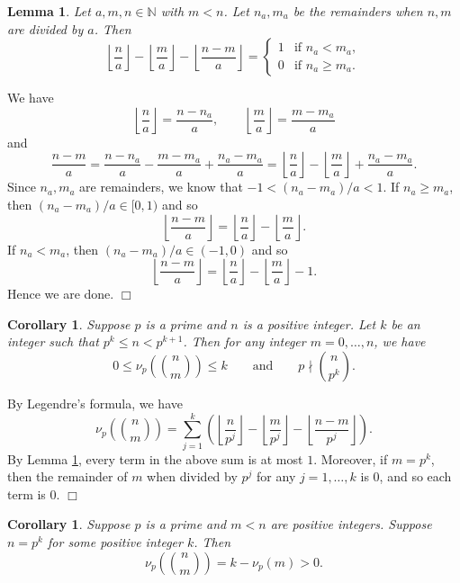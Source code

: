 \documentclass{article}
\def\N{{\mathbb N}}
\newtheorem{cor}[subsection]{Corollary}
\newtheorem{lemma}[subsection]{Lemma}
\newenvironment{proof}{\noindent {\bf Proof:}}{$\Box$ \vspace{2 ex}}
\begin{document}
\begin{lemma}\label{lem:ind}
    Let $a,m,n\in\N$ with $m < n$. Let $n_a,m_a$ be the remainders when $n,m$ are divided by $a$. Then
    $$\left\lfloor\frac{n}{a}\right\rfloor - \left\lfloor\frac{m}{a}\right\rfloor - \left\lfloor\frac{n-m}{a}\right\rfloor = \begin{cases}
        1&\mbox{if }n_a < m_a,\\
        0&\mbox{if }n_a\geq m_a.
    \end{cases}$$
\end{lemma}

\begin{proof}
    We have
    $$\left\lfloor\frac{n}{a}\right\rfloor = \frac{n-n_a}{a},\qquad\left\lfloor\frac{m}{a}\right\rfloor = \frac{m-m_a}{a}$$ and $$\frac{n-m}{a} = \frac{n-n_a}{a} - \frac{m-m_a}{a} + \frac{n_a-m_a}{a} = \left\lfloor\frac{n}{a}\right\rfloor - \left\lfloor\frac{m}{a}\right\rfloor+ \frac{n_a-m_a}{a}.$$
    Since $n_a,m_a$ are remainders, we know that $-1 < (n_a-m_a)/a < 1$. If $n_a\geq m_a$, then $(n_a-m_a)/a \in [0,1)$ and so $$\left\lfloor\frac{n-m}{a}\right\rfloor = \left\lfloor\frac{n}{a}\right\rfloor - \left\lfloor\frac{m}{a}\right\rfloor.$$
    If $n_a < m_a$, then $(n_a-m_a)/a \in (-1,0)$ and so $$\left\lfloor\frac{n-m}{a}\right\rfloor = \left\lfloor\frac{n}{a}\right\rfloor - \left\lfloor\frac{m}{a}\right\rfloor - 1.$$
    Hence we are done.
\end{proof}

\begin{cor}\label{cor:notdiv}
    Suppose $p$ is a prime and $n$ is a positive integer. Let $k$ be an integer such that $p^k\leq n < p^{k+1}$. Then for any integer $m=0,\ldots,n$, we have
    $$0\leq \nu_p\left(\binom{n}{m}\right) \leq k\qquad\mbox{and}\qquad p\nmid \binom{n}{p^k}.$$
\end{cor}

\begin{proof}
    By Legendre's formula, we have
    $$\nu_p\left(\binom{n}{m}\right) = \sum_{j=1}^k \left(\left\lfloor\frac{n}{p^j}\right\rfloor - \left\lfloor\frac{m}{p^j}\right\rfloor - \left\lfloor\frac{n-m}{p^j}\right\rfloor\right).$$
    By Lemma \ref{lem:ind}, every term in the above sum is at most $1$. Moreover, if $m = p^k$, then the remainder of $m$ when divided by $p^j$ for any $j = 1,\ldots,k$ is $0$, and so each term is $0$.
\end{proof}

\begin{cor}\label{cor:ndivp}
    Suppose $p$ is a prime and $m<n$ are positive integers. Suppose $n = p^k$ for some positive integer $k$. Then
    $$\nu_p\left(\binom{n}{m}\right) = k - \nu_p(m) > 0.$$
\end{cor}
\end{document}
